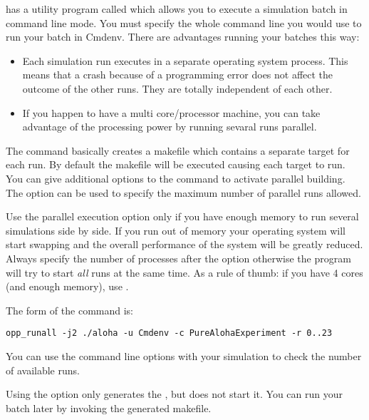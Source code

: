 \opp has a utility program called  which 
allows you to execute a simulation batch in command line mode. 
You must specify the whole command line you would use to run 
your batch in Cmdenv. There are advantages running your batches
this way:
\begin{itemize}
  \item Each simulation run executes in a separate operating system process.
        This means that a crash because of a programming error does not affect
        the outcome of the other runs. They are totally independent of each other.
  \item If you happen to have a multi core/processor machine, you can take advantage
        of the processing power by running sevaral runs parallel.
\end{itemize}

The command basically creates a makefile which contains
a separate target for each run. By default the makefile will be executed causing each 
target to run. You can give additional options to the  command to
activate parallel building. The  option can be used to specify the maximum number 
of parallel runs allowed. 

\begin{warning}
  Use the parallel execution option only if you have enough memory to run several simulations
  side by side. If you run out of memory your operating system will start swapping and the overall
  performance of the system will be greatly reduced. Always specify the number of processes 
  after the  option otherwise the  program will try to start \textit{all}
  runs at the same time. As a rule of thumb: if you have 4 cores (and enough memory), use .
\end{warning}

The form of the command is:
\begin{verbatim}
opp_runall -j2 ./aloha -u Cmdenv -c PureAlohaExperiment -r 0..23
\end{verbatim}

You can use the  command line options with your simulation to 
check the number of available runs.

Using the  option only generates the , but does not start it.
You can run your batch later by invoking the generated makefile.



